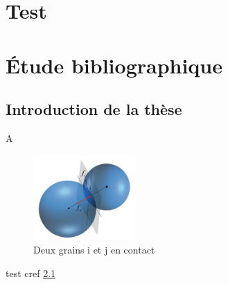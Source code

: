 \documentclass{book}
\begin{document}
\chapter{Test}
\label{chap-test}


\foreignlanguage{danish}{}

\foreignlanguage{french}{}



\chapter{Étude bibliographique}
\section{Introduction de la thèse}
A
\begin{figure}[h!]
\centering
\includegraphics[width=0.35\textwidth]{DEM.jpg}
\caption{Deux grains i et j en contact}
\label{fig:contactDEM}
\end{figure}



test cref \cref{fig:contactDEM}


\end{document}
